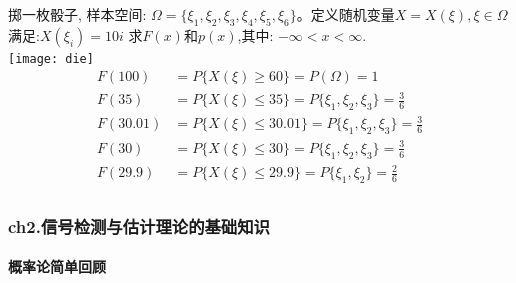 \begin{frame}[shrink]
掷一枚骰子, 样本空间: $\Omega=\{\xi_1,\xi_2,\xi_3,\xi_4,\xi_5,\xi_6\}$。定义随机变量$X=X(\xi),\xi\in \Omega$满足:$X(\xi_i)=10i$
求$F(x)$和$p(x)$,其中: $-\infty<x<\infty$.\\
\texttt{[image: die]}
\begin{align*}
F(100)&=P\{X(\xi)\ge 60 \}=P(\Omega)=1\\
F(35)&=P\{X(\xi)\le 35 \}=P\{\xi_1,\xi_2,\xi_3 \}=\frac{3}{6} \\
F(30.01)&=P\{X(\xi)\le 30.01 \}=P\{\xi_1,\xi_2,\xi_3 \}=\frac{3}{6} \\
F(30)&=P\{X(\xi)\le 30 \}=P\{\xi_1,\xi_2,\xi_3 \}=\frac{3}{6} \\
F(29.9)&=P\{X(\xi)\le 29.9 \}=P\{\xi_1,\xi_2 \}=\frac{2}{6} \\
\end{align*}
\end{frame}

\begin{frame}[shrink]
\frametitle{ch2.信号检测与估计理论的基础知识}
\framesubtitle{概率论简单回顾}
\tableofcontents[hideallsubsections]
\end{frame}



